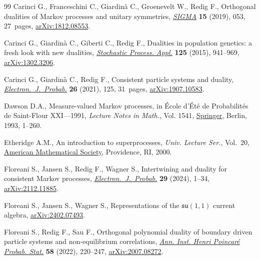 \documentclass[11pt]{article}
\numberwithin{equation}{section}
\numberwithin{equation}{section}
\newcommand{\1}{\mathbbm{1}}
\begin{document}
\begin{thebibliography}{99}
Carinci G., Franceschini C., Giardin\`a C., Groenevelt W., Redig F., Orthogonal
 dualities of {M}arkov processes and unitary symmetries, \href{https://doi.org/10.3842/SIGMA.2019.053}{\textit{SIGMA}}
 \textbf{15} (2019), 053, 27~pages, \href{https://arxiv.org/abs/1812.08553}{arXiv:1812.08553}.

Carinci G., Giardin\`a C., Giberti C., Redig F., Dualities in population
 genetics: a fresh look with new dualities, \href{https://doi.org/10.1016/j.spa.2014.10.009}{\textit{Stochastic Process. Appl.}}
 \textbf{125} (2015), 941--969, \href{https://arxiv.org/abs/1302.3206}{arXiv:1302.3206}.

Carinci G., Giardin\`a C., Redig F., Consistent particle systems and duality,
 \href{https://doi.org/10.1214/21-ejp684}{\textit{Electron.~J.~Probab.}} \textbf{26} (2021), 125, 31~pages,
 \href{https://arxiv.org/abs/1907.10583}{arXiv:1907.10583}.

Dawson D.A., Measure-valued {M}arkov processes, in \'Ecole d'\'Et\'e de
 {P}robabilit\'es de {S}aint-{F}lour {XXI}---1991, \textit{Lecture Notes in
 Math.}, Vol. 1541, \href{https://doi.org/10.1007/BFb0084190}{Springer}, Berlin, 1993, 1--260.

Etheridge A.M., An introduction to superprocesses, \textit{Univ. Lecture Ser.},
 Vol.~20, \href{https://doi.org/10.1090/ulect/020}{American Mathematical Society}, Providence, RI, 2000.

Floreani S., Jansen S., Redig F., Wagner S., Intertwining and duality for
 consistent {M}arkov processes, \href{https://doi.org/10.1214/24-ejp1124}{\textit{Electron.~J.~Probab.}} \textbf{29}
 (2024), 1--34, \href{https://arxiv.org/abs/2112.11885}{arXiv:2112.11885}.

Floreani S., Jansen S., Wagner S., Representations of the $\mathfrak{su}(1,1)$
 current algebra, \href{https://arxiv.org/abs/2402.07493}{arXiv:2402.07493}.

Floreani S., Redig F., Sau F., Orthogonal polynomial duality of boundary driven
 particle systems and non-equilibrium correlations, \href{https://doi.org/10.1214/21-aihp1163}{\textit{Ann. Inst. Henri
 Poincar\'e Probab. Stat.}} \textbf{58} (2022), 220--247, \href{https://arxiv.org/abs/2007.08272}{arXiv:2007.08272}.


\end{thebibliography}
\end{document}

